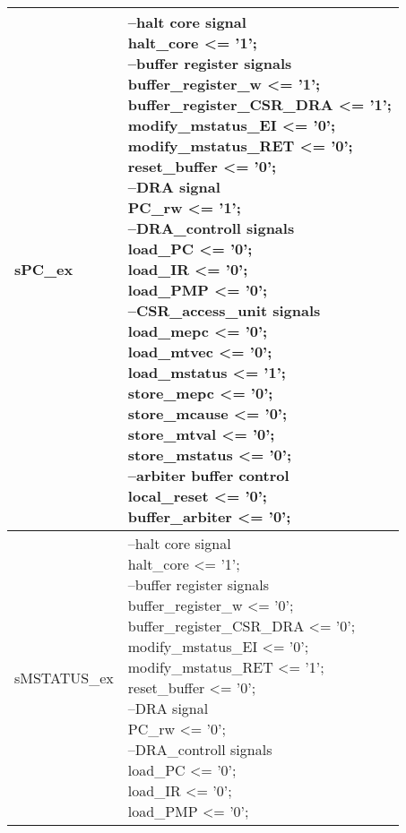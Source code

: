 \begin{longtable}{| p{} | p{} |}
	\hline
	sPC\_ex & \makecell{--halt core signal\\
		halt\_core <= '1';\\
		--buffer register signals\\
		buffer\_register\_w <= '1';\\
		buffer\_register\_CSR\_DRA <= '1';\\
		modify\_mstatus\_EI <= '0';\\
		modify\_mstatus\_RET <= '0';\\
		reset\_buffer <= '0';\\
		--DRA signal\\
		PC\_rw <= '1';\\
		--DRA\_controll signals\\
		load\_PC <= '0';\\
		load\_IR <= '0';\\
		load\_PMP <= '0';\\
		--CSR\_access\_unit signals\\
		load\_mepc <= '0';\\
		load\_mtvec <= '0';\\
		load\_mstatus <= '1';\\
		store\_mepc <= '0';\\
		store\_mcause <= '0';\\
		store\_mtval <= '0';\\
		store\_mstatus <= '0';\\
		--arbiter buffer control\\
		local\_reset <= '0';\\
		buffer\_arbiter <= '0';} \\
	\hline
	sMSTATUS\_ex & \makecell{--halt core signal\\
		halt\_core <= '1';\\
		--buffer register signals\\
		buffer\_register\_w <= '0';\\
		buffer\_register\_CSR\_DRA <= '0';\\
		modify\_mstatus\_EI <= '0';\\
		modify\_mstatus\_RET <= '1';\\
		reset\_buffer <= '0';\\
		--DRA signal\\
		PC\_rw <= '0';\\
		--DRA\_controll signals\\
		load\_PC <= '0';\\
		load\_IR <= '0';\\
		load\_PMP <= '0';\\
}
\end{longtable}
